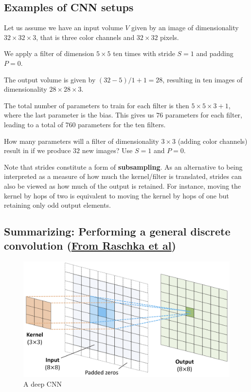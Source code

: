 \documentclass[%
oneside,                 %
final,                   %
10pt]{article}
\begin{document}
\subsection{Examples of CNN setups}

Let us assume we have an input volume $V$ given by an image of dimensionality
$32\times 32 \times 3$, that is three color channels and $32\times 32$ pixels.

We apply a filter of dimension $5\times 5$ ten times with stride $S=1$ and padding $P=0$.

The output volume is given by $(32-5)/1+1=28$, resulting in ten images
of dimensionality $28\times 28\times 3$.

The total number of parameters to train for each filter is then
$5\times 5\times 3+1$, where the last parameter is the bias. This
gives us $76$ parameters for each filter, leading to a total of $760$
parameters for the ten filters.

How many parameters will a filter of dimensionality $3\times 3$
(adding color channels) result in if we produce $32$ new images? Use $S=1$ and $P=0$.

Note that strides constitute a form of \textbf{subsampling}. As an alternative to
being interpreted as a measure of how much the kernel/filter is translated, strides
can also be viewed as how much of the output is retained. For instance, moving
the kernel by hops of two is equivalent to moving the kernel by hops of one but
retaining only odd output elements.

\subsection{Summarizing: Performing a general discrete convolution (\href{{https://github.com/rasbt/machine-learning-book}}{From Raschka et al})}

\begin{figure}[!ht]  %
  \centerline{\includegraphics[width=0.67\linewidth]{figslides/discreteconv1.png}}
  \caption{
  A deep CNN
  }
\end{figure}
\end{document}
